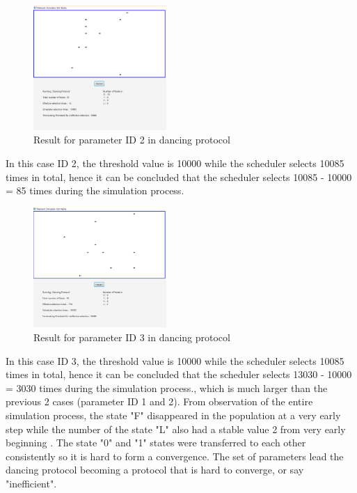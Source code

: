 \FloatBarrier
\begin{figure}[H]
\begin{center}
\includegraphics[width =0.45\textwidth]{context/diagram/Dancing_NoneFastForwardingF5.png}
\caption{Result for parameter ID 2 in dancing protocol}
\label{capture_dance_res2}
\end{center}
\end{figure}
\par\noindent
In this case ID 2, the threshold value is 10000 while the scheduler selects 10085 times in total,
hence it can be concluded that the scheduler selects 10085 - 10000 = 85 times during the simulation process.

\FloatBarrier
\begin{figure}[H]
\begin{center}
\includegraphics[width =0.45\textwidth]{context/diagram/Dancing_NoneFastForwardingF4.png}
\caption{Result for parameter ID 3 in dancing protocol}
\label{capture_dance_res3}
\end{center}
\end{figure}
\par\noindent
In this case ID 3, the threshold value is 10000 while the scheduler selects 10085 times in total,
hence it can be concluded that the scheduler selects 13030 - 10000 = 3030 times during the simulation process., which is much larger than the previous 2 cases (parameter ID 1 and 2).
From observation of the entire simulation process, the state "F" disappeared in the population at a very early step while
the number of the state "L" also had a stable value 2 from very early beginning .
The state "0" and "1" states were transferred to each other consistently so it is hard to form a convergence.
The set of parameters lead the dancing protocol becoming a protocol that is hard to converge, or say "inefficient".

